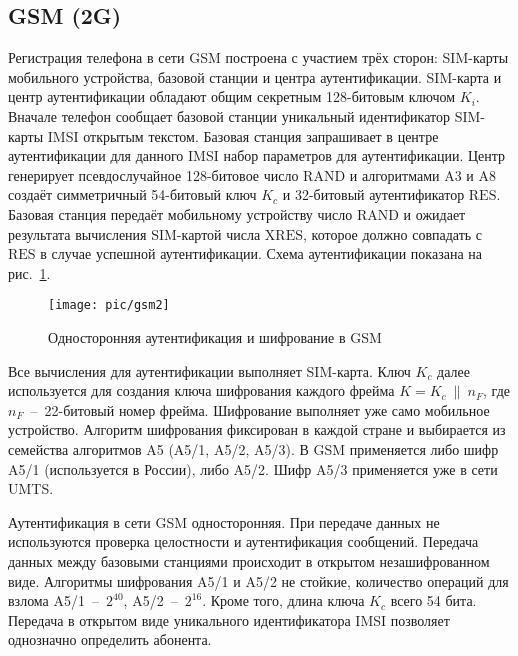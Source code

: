 \subsection{GSM (2G)}

Регистрация телефона в сети GSM построена с участием трёх сторон: SIM-карты мобильного устройства, базовой станции и центра аутентификации. SIM-карта и центр аутентификации обладают общим секретным 128-битовым ключом $K_i$. Вначале телефон сообщает базовой станции уникальный идентификатор SIM-карты IMSI открытым текстом. Базовая станция запрашивает в центре аутентификации для данного IMSI набор параметров для аутентификации. Центр генерирует псевдослучайное 128-битовое число $\textrm{RAND}$ и алгоритмами A3 и A8 создаёт симметричный 54-битовый ключ $K_c$ и 32-битовый аутентификатор $\textrm{RES}$. Базовая станция передаёт мобильному устройству число $\textrm{RAND}$ и ожидает результата вычисления SIM-картой числа $\textrm{XRES}$, которое должно совпадать с $\textrm{RES}$ в случае успешной аутентификации. Схема аутентификации показана на рис.~\ref{fig:gsm2}.

\begin{figure}[!ht]
	\centering
	\texttt{[image: pic/gsm2]}
	\caption{Односторонняя аутентификация и шифрование в GSM\label{fig:gsm2}}
\end{figure}

Все вычисления для аутентификации выполняет SIM-карта. Ключ $K_c$ далее используется для создания ключа шифрования каждого фрейма $K = K_c ~\|~ n_F$, где $n_F$~--~22-битовый номер фрейма. Шифрование выполняет уже само мобильное устройство. Алгоритм шифрования фиксирован в каждой стране и выбирается из семейства алгоритмов A5 (A5/1, A5/2, A5/3). В GSM применяется либо шифр A5/1 (используется в России), либо A5/2. Шифр A5/3 применяется уже в сети UMTS.

Аутентификация в сети GSM односторонняя. При передаче данных не используются проверка целостности и аутентификация сообщений. Передача данных между базовыми станциями происходит в открытом незашифрованном виде. Алгоритмы шифрования A5/1 и A5/2 не стойкие, количество операций для взлома A5/1~--~$2^{40}$, A5/2~--~$2^{16}$. Кроме того, длина ключа $K_c$ всего 54 бита. Передача в открытом виде уникального идентификатора IMSI позволяет однозначно определить абонента.
